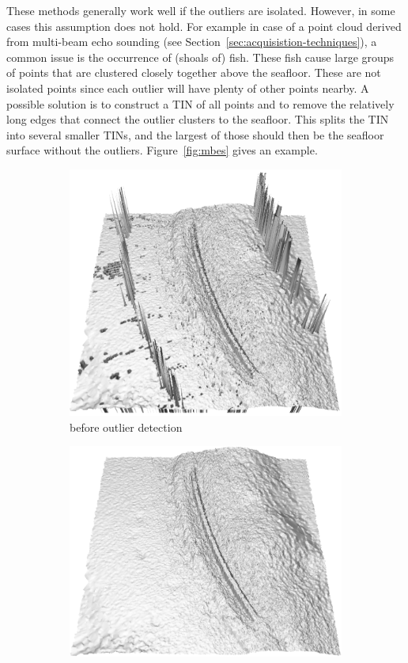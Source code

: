 These methods generally work well if the outliers are isolated.
However, in some cases this assumption does not hold.
For example in case of a point cloud derived from multi-beam echo sounding (see Section~\ref{sec:acquisistion-techniques}), a common issue is the occurrence of (shoals of) fish. 
These fish cause large groups of points that are clustered closely together above the seafloor.
These are not isolated points since each outlier will have plenty of other points nearby.
A possible solution is to construct a TIN of all points and to remove the relatively long edges that connect the outlier clusters to the seafloor.
This splits the TIN into several smaller TINs, and the largest of those should then be the seafloor surface without the outliers. 
Figure~\ref{fig:mbes} gives an example.
\begin{figure}
  \centering
  \begin{subfigure}[b]{0.44\linewidth}
    \centering
    \includegraphics[width=\textwidth]{mbes_cleaning_before.png}
    \caption{before outlier detection}
  \end{subfigure}
  \qquad%
  \begin{subfigure}[b]{0.44\linewidth}
    \centering
    \includegraphics[width=\textwidth]{mbes_cleaning_after.png}

\end{subfigure}
\end{figure}

